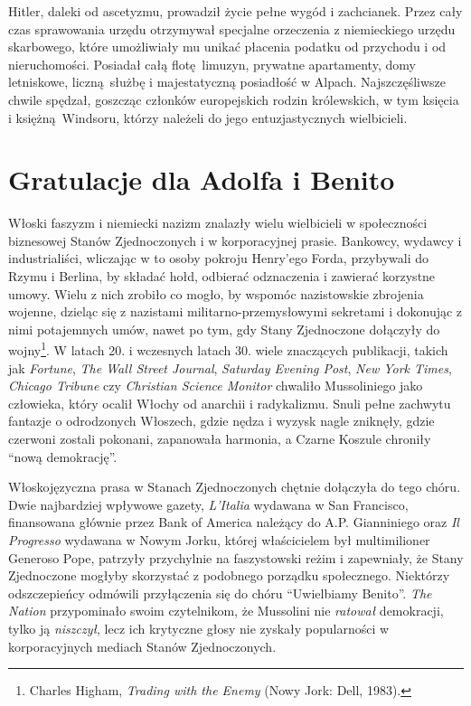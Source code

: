 \documentclass[12pt]{book}
\newcommand{\sekcja}[1]{
  \addcontentsline{toc}{section}{#1}
  \section*{#1}
}
\begin{document}
Hitler, daleki od ascetyzmu, prowadził życie pełne wygód i zachcianek. Przez cały czas sprawowania urzędu otrzymywał specjalne orzeczenia z niemieckiego urzędu skarbowego, które umożliwiały mu unikać płacenia podatku od przychodu i od nieruchomości. Posiadał całą flotę limuzyn, prywatne apartamenty, domy letniskowe, liczną służbę i majestatyczną posiadłość w Alpach. Najszczęśliwsze chwile spędzał, goszcząc członków europejskich rodzin królewskich, w tym księcia i księżną Windsoru, którzy należeli do jego entuzjastycznych wielbicieli.

\sekcja{Gratulacje dla Adolfa i Benito}
Włoski faszyzm i niemiecki nazizm znalazły wielu wielbicieli w społeczności biznesowej Stanów Zjednoczonych i w korporacyjnej prasie. Bankowcy, wydawcy i industrialiści, wliczając w to osoby pokroju Henry'ego Forda, przybywali do Rzymu i Berlina, by składać hołd, odbierać odznaczenia i zawierać korzystne umowy. Wielu z nich zrobiło co mogło, by wspomóc nazistowskie zbrojenia wojenne, dzieląc się z nazistami militarno-przemysłowymi sekretami i dokonując z nimi potajemnych umów, nawet po tym, gdy Stany Zjednoczone dołączyły do wojny\footnote{Charles Higham, \textit{Trading with the Enemy} (Nowy Jork: Dell, 1983).}. W latach 20. i wczesnych latach 30. wiele znaczących publikacji, takich jak \textit{Fortune}, \textit{The Wall Street Journal}, \textit{Saturday Evening Post}, \textit{New York Times}, \textit{Chicago Tribune} czy \textit{Christian Science Monitor} chwaliło Mussoliniego jako człowieka, który ocalił Włochy od anarchii i radykalizmu. Snuli pełne zachwytu fantazje o odrodzonych Włoszech, gdzie nędza i wyzysk nagle zniknęły, gdzie czerwoni zostali pokonani, zapanowała harmonia, a Czarne Koszule chroniły ``nową demokrację''.

Włoskojęzyczna prasa w Stanach Zjednoczonych chętnie dołączyła do tego chóru. Dwie najbardziej wpływowe gazety, \textit{L'Italia} wydawana w San Francisco, finansowana głównie przez Bank of America należący do A.P. Gianniniego oraz \textit{Il Progresso} wydawana w Nowym Jorku, której właścicielem był multimilioner Generoso Pope, patrzyły przychylnie na faszystowski reżim i zapewniały, że Stany Zjednoczone mogłyby skorzystać z podobnego porządku społecznego. Niektórzy odszczepieńcy odmówili przyłączenia się do chóru ``Uwielbiamy Benito''. \textit{The Nation} przypominało swoim czytelnikom, że Mussolini nie \textit{ratował} demokracji, tylko ją \textit{niszczył}, lecz ich krytyczne głosy nie zyskały popularności w korporacyjnych mediach Stanów Zjednoczonych.
\end{document}
